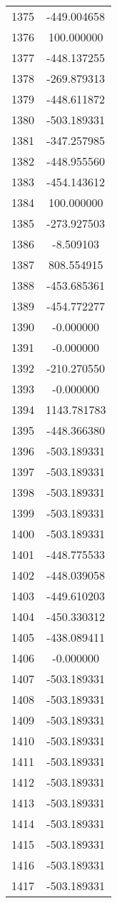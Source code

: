 \documentclass[12pt]{article}
\begin{document}
\begin{longtable}{@{}cc@{}}
1375 & -449.004658 \\
1376 & 100.000000 \\
1377 & -448.137255 \\
1378 & -269.879313 \\
1379 & -448.611872 \\
1380 & -503.189331 \\
1381 & -347.257985 \\
1382 & -448.955560 \\
1383 & -454.143612 \\
1384 & 100.000000 \\
1385 & -273.927503 \\
1386 & -8.509103 \\
1387 & 808.554915 \\
1388 & -453.685361 \\
1389 & -454.772277 \\
1390 & -0.000000 \\
1391 & -0.000000 \\
1392 & -210.270550 \\
1393 & -0.000000 \\
1394 & 1143.781783 \\
1395 & -448.366380 \\
1396 & -503.189331 \\
1397 & -503.189331 \\
1398 & -503.189331 \\
1399 & -503.189331 \\
1400 & -503.189331 \\
1401 & -448.775533 \\
1402 & -448.039058 \\
1403 & -449.610203 \\
1404 & -450.330312 \\
1405 & -438.089411 \\
1406 & -0.000000 \\
1407 & -503.189331 \\
1408 & -503.189331 \\
1409 & -503.189331 \\
1410 & -503.189331 \\
1411 & -503.189331 \\
1412 & -503.189331 \\
1413 & -503.189331 \\
1414 & -503.189331 \\
1415 & -503.189331 \\
1416 & -503.189331 \\
1417 & -503.189331 \\

\end{longtable}
\end{document}
